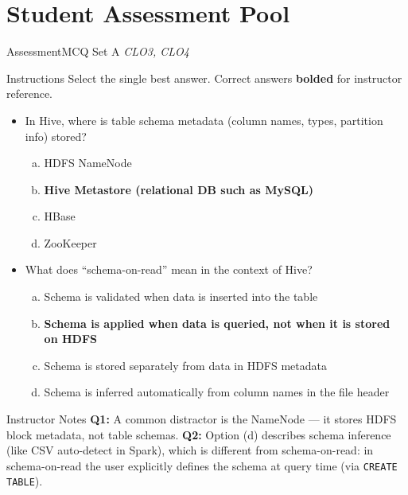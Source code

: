 \documentclass[aspectratio=169,10pt]{beamer}
\begin{document}
\section{Student Assessment Pool}

\begin{frame}{Assessment\textemdash MCQ Set A \hfill\small\textit{CLO3, CLO4}}
  \begin{exampleblock}{Instructions}
    Select the single best answer.  Correct answers \textbf{bolded} for instructor reference.
  \end{exampleblock}
  \vspace{8pt}
  \begin{itemize}
    \item[\textbf{Q1.}] In Hive, where is table schema metadata (column names, types, partition info) stored?
    \begin{enumerate}[(a)]
      \item HDFS NameNode
      \item \textbf{Hive Metastore (relational DB such as MySQL)}
      \item HBase
      \item ZooKeeper
    \end{enumerate}
  \end{itemize}
  \vspace{8pt}
  \begin{itemize}
    \item[\textbf{Q2.}] What does ``schema-on-read'' mean in the context of Hive?
    \begin{enumerate}[(a)]
      \item Schema is validated when data is inserted into the table
      \item \textbf{Schema is applied when data is queried, not when it is stored on HDFS}
      \item Schema is stored separately from data in HDFS metadata
      \item Schema is inferred automatically from column names in the file header
    \end{enumerate}
  \end{itemize}
  \vspace{8pt}
  \begin{alertblock}{Instructor Notes}
    \textbf{Q1:} A common distractor is the NameNode --- it stores HDFS block metadata, not table schemas.  \textbf{Q2:} Option (d) describes schema inference (like CSV auto-detect in Spark), which is different from schema-on-read: in schema-on-read the user explicitly defines the schema at query time (via \texttt{CREATE TABLE}).
  \end{alertblock}
\end{frame}
\end{document}
